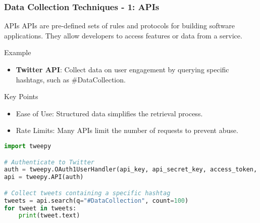 \documentclass{beamer}
\begin{document}
\begin{frame}[fragile]
    \frametitle{Data Collection Techniques - 1: APIs}
    \begin{block}{APIs}
        APIs are pre-defined sets of rules and protocols for building software applications. They allow developers to access features or data from a service.
    \end{block}
    
    \begin{exampleblock}{Example}
        \begin{itemize}
            \item \textbf{Twitter API}: Collect data on user engagement by querying specific hashtags, such as \#DataCollection.
        \end{itemize}
    \end{exampleblock}
    
    \begin{block}{Key Points}
        \begin{itemize}
            \item Ease of Use: Structured data simplifies the retrieval process.
            \item Rate Limits: Many APIs limit the number of requests to prevent abuse.
        \end{itemize}
    \end{block}

    \begin{lstlisting}[language=Python]
import tweepy

# Authenticate to Twitter
auth = tweepy.OAuth1UserHandler(api_key, api_secret_key, access_token, access_token_secret)
api = tweepy.API(auth)

# Collect tweets containing a specific hashtag
tweets = api.search(q="#DataCollection", count=100)
for tweet in tweets:
    print(tweet.text)
    \end{lstlisting}
\end{frame}
\end{document}
